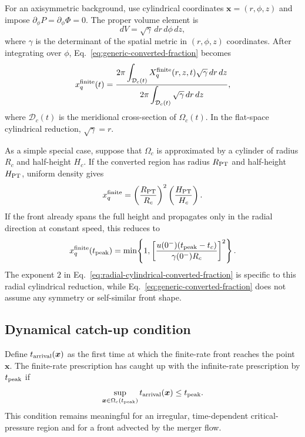 \documentclass[11pt]{article}
\begin{document}
For an axisymmetric background, use cylindrical coordinates \(\boldsymbol{x}=(r,\phi,z)\) and impose \(\partial_\phi P=\partial_\phi\Phi=0\).
The proper volume element is
\begin{equation}
dV
=
\sqrt{\gamma}\,dr\,d\phi\,dz,
\end{equation}
where \(\gamma\) is the determinant of the spatial metric in \((r,\phi,z)\) coordinates.
After integrating over \(\phi\), Eq.~\eqref{eq:generic-converted-fraction} becomes
\begin{equation}
x_q^{\rm finite}(t)
=
\frac{
\displaystyle
2\pi\int_{\mathcal D_c(t)}
X_q^{\rm finite}(r,z,t)
\sqrt{\gamma}\,dr\,dz
}{
\displaystyle
2\pi\int_{\mathcal D_c(t)}
\sqrt{\gamma}\,dr\,dz
},
\label{eq:axisymmetric-converted-fraction}
\end{equation}
where \(\mathcal D_c(t)\) is the meridional cross-section of \(\Omega_c(t)\).
In the flat-space cylindrical reduction, \(\sqrt{\gamma}=r\).

As a simple special case, suppose that \(\Omega_c\) is approximated by a cylinder of radius \(R_c\) and half-height \(H_c\).
If the converted region has radius \(R_{\rm PT}\) and half-height \(H_{\rm PT}\), uniform density gives
\begin{equation}
x_q^{\rm finite}
=
\left(\frac{R_{\rm PT}}{R_c}\right)^2
\left(\frac{H_{\rm PT}}{H_c}\right).
\label{eq:cylindrical-converted-fraction}
\end{equation}
If the front already spans the full height and propagates only in the radial direction at constant speed, this reduces to
\begin{equation}
x_q^{\rm finite}(t_{\rm peak})
=
\min\!\left\{
1,
\left[
\frac{u(0^-)(t_{\rm peak}-t_c)}
{\gamma(0^-)R_c}
\right]^2
\right\}.
\label{eq:radial-cylindrical-converted-fraction}
\end{equation}
The exponent \(2\) in Eq.~\eqref{eq:radial-cylindrical-converted-fraction} is specific to this radial cylindrical reduction, while Eq.~\eqref{eq:generic-converted-fraction} does not assume any symmetry or self-similar front shape.

\subsection{Dynamical catch-up condition}
\label{sec:gw-catch-up}

Define \(t_{\rm arrival}(\boldsymbol{x})\) as the first time at which the finite-rate front reaches the point \(\boldsymbol{x}\).
The finite-rate prescription has caught up with the infinite-rate prescription by \(t_{\rm peak}\) if
\begin{equation}
\sup_{\boldsymbol{x}\in\Omega_c(t_{\rm peak})}
t_{\rm arrival}(\boldsymbol{x})
\leq
t_{\rm peak}.
\label{eq:generic-catch-up-condition}
\end{equation}
This condition remains meaningful for an irregular, time-dependent critical-pressure region and for a front advected by the merger flow.
\end{document}
